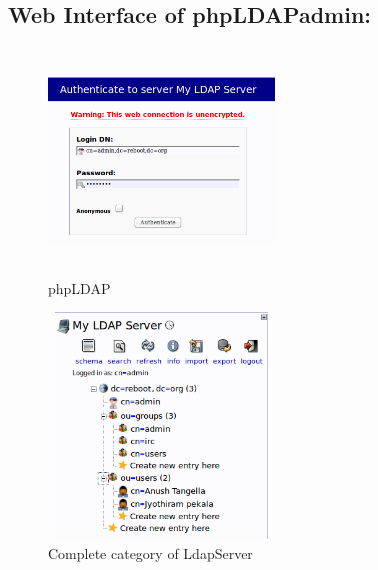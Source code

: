 \documentclass[12pt]{report}
\begin{document}
\subsection{Web Interface of phpLDAPadmin:}
\begin{multicols}{2}
\begin{flushleft}

		\begin{figure}[H]
		\begin{center}
		\includegraphics[width=6cm,height=6cm]{Screens/LdapServerLogin.png}
		\caption{phpLDAP \label{fig: phpLDAP }}
		\end{center}
		\end{figure}

\end{flushleft}
\begin{flushright}

		\begin{figure}[H]
		\begin{center}
		\includegraphics[width=6cm,height=6cm]{Screens/serversidebar.png}
		\caption{Complete category of LdapServer \label{fig: Complete category of LdapServer}}
		\end{center}
		\end{figure}
	

\end{flushright}
\end{multicols}
\end{document}
